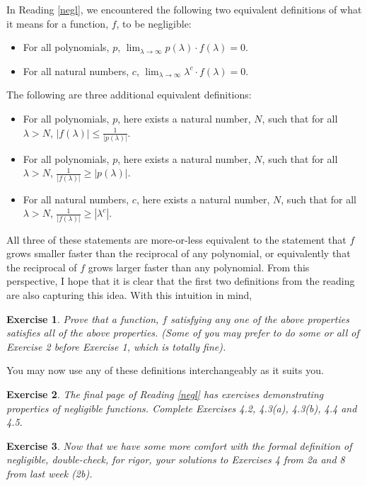 \documentclass[12pt]{article}
\newcommand{\verts}[1]{\left\vert #1\right\vert}
\newtheorem{exercise}{Exercise}
\theoremstyle{definition}
\theoremstyle{remark}
\theoremstyle{definition}
\begin{document}
In Reading \ref{negl}, we encountered the following two equivalent definitions of what it means for a function, $f$, to be negligible:
\begin{itemize}
\item For all polynomials, $p$, $\lim_{\lambda\to\infty}p(\lambda)\cdot f(\lambda) = 0$.
\item For all natural numbers, $c$, $\lim_{\lambda\to\infty}\lambda^c\cdot f(\lambda) = 0$.
\end{itemize}
The following are three additional equivalent definitions:
\begin{itemize}
\item For all polynomials, $p$, here exists a natural number, $N$, such that for all $\lambda>N$, $\verts{f(\lambda)}\leq \frac{1}{\verts{p(\lambda)}}$.
\item For all polynomials, $p$, here exists a natural number, $N$, such that for all $\lambda>N$, $\frac{1}{\verts{f(\lambda)}}\geq \verts{p(\lambda)}$.
\item For all natural numbers, $c$, here exists a natural number, $N$, such that for all $\lambda>N$, $\frac{1}{\verts{f(\lambda)}}\geq \verts{\lambda^c}$.
\end{itemize}
All three of these statements are more-or-less equivalent to the statement that $f$ grows smaller faster than the reciprocal of any polynomial, or equivalently that the reciprocal of $f$ grows larger faster than any polynomial. From this perspective, I hope that it is clear that the first two definitions from the reading are also capturing this idea. With this intuition in mind,

\begin{exercise}
Prove that a function, $f$ satisfying any one of the above properties satisfies all of the above properties. (Some of you may prefer to do some or all of Exercise 2 before Exercise 1, which is totally fine).
\end{exercise}

You may now use any of these definitions interchangeably as it suits you.

\begin{exercise}
The final page of Reading \ref{negl} has exercises demonstrating properties of negligible functions. Complete Exercises 4.2, 4.3(a), 4.3(b), 4.4 and 4.5.
\end{exercise}

\begin{exercise}
Now that we have some more comfort with the formal definition of negligible, double-check, for rigor, your solutions to Exercises 4 from 2a and 8 from last week (2b).
\end{exercise}
\end{document}
